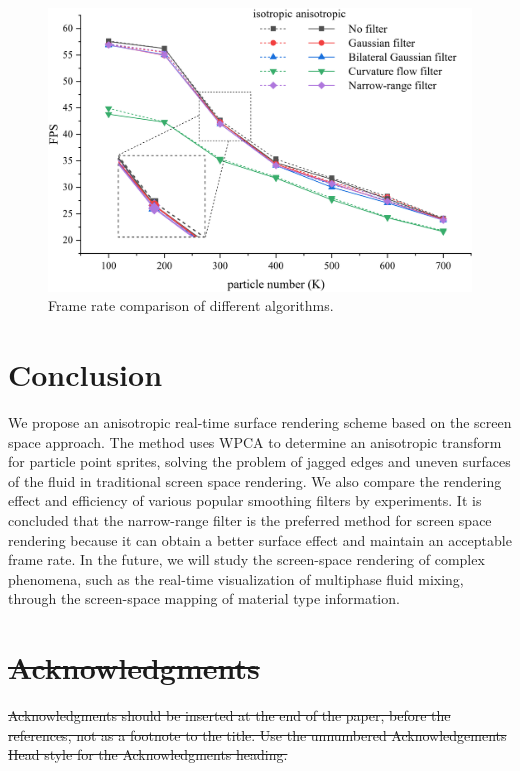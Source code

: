 \documentclass[times,twocolumn,final]{elsarticle}
\providecommand{\DIFdeltex}[1]{{\protect\color{red}\sout{#1}}}                      %
\providecommand{\DIFdelbegin}{} %
\providecommand{\DIFdelend}{} %
\providecommand{\DIFaddbeginFL}{} %
\providecommand{\DIFaddendFL}{} %
\providecommand{\DIFdelbeginFL}{} %
\providecommand{\DIFdelendFL}{} %
\providecommand{\DIFdel}[1]{\texorpdfstring{\DIFdeltex{#1}}{}} %
\begin{document}
\begin{figure}[!t]
    \centering
    \DIFdelbeginFL %
\DIFdelendFL \DIFaddbeginFL \includegraphics[width=\linewidth]{figs/FPS.png}
    \DIFaddendFL \caption{Frame rate comparison of different algorithms.}
    \label{fig:figure8}
\end{figure}

\section{Conclusion}
We propose an anisotropic real-time surface rendering scheme based on the screen space approach. The method uses WPCA to determine an anisotropic transform for particle point sprites, solving the problem of jagged edges and uneven surfaces of the fluid in traditional screen space rendering. We also compare the rendering effect and efficiency of various popular smoothing filters by experiments. It is concluded that the narrow-range filter is the preferred method for screen space rendering because it can obtain a better surface effect and maintain an acceptable frame rate. In the future, we will study the screen-space rendering of complex phenomena, such as the real-time visualization of multiphase fluid mixing, through the screen-space mapping of material type information.
\DIFdelbegin %

\section*{\DIFdel{Acknowledgments}}
\DIFdel{Acknowledgments should be inserted at the end of the paper, before the
references, not as a footnote to the title. Use the unnumbered
Acknowledgements Head style for the Acknowledgments heading.
}\DIFdelend %






\end{document}
